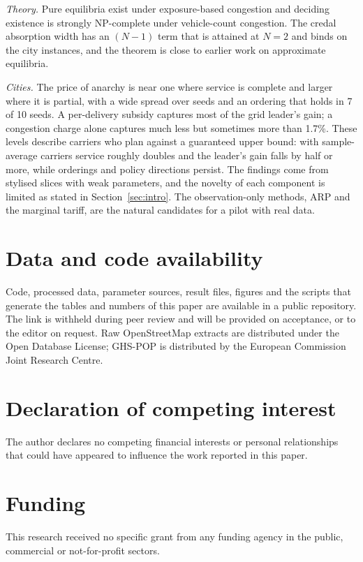 \documentclass[preprint,11pt]{elsarticle}
\theoremstyle{definition}
\theoremstyle{remark}
\begin{document}
\emph{Theory.} Pure equilibria exist under exposure-based congestion and deciding existence is strongly NP-complete under vehicle-count congestion. The credal absorption width has an $(N-1)$ term that is attained at $N=2$ and binds on the city instances, and the theorem is close to earlier work on approximate equilibria.

\emph{Cities.} The price of anarchy is near one where service is complete and larger where it is partial, with a wide spread over seeds and an ordering that holds in 7 of 10 seeds. A per-delivery subsidy captures most of the grid leader's gain; a congestion charge alone captures much less but sometimes more than 1.7\%. These levels describe carriers who plan against a guaranteed upper bound: with sample-average carriers service roughly doubles and the leader's gain falls by half or more, while orderings and policy directions persist. The findings come from stylised slices with weak parameters, and the novelty of each component is limited as stated in Section~\ref{sec:intro}. The observation-only methods, ARP and the marginal tariff, are the natural candidates for a pilot with real data.

\section*{Data and code availability}
Code, processed data, parameter sources, result files, figures and the scripts that generate the tables and numbers of this paper are available in a public repository. The link is withheld during peer review and will be provided on acceptance, or to the editor on request. Raw OpenStreetMap extracts are distributed under the Open Database License; GHS-POP is distributed by the European Commission Joint Research Centre.

\section*{Declaration of competing interest}
The author declares no competing financial interests or personal relationships that could have appeared to influence the work reported in this paper.

\section*{Funding}
This research received no specific grant from any funding agency in the public, commercial or not-for-profit sectors.
\end{document}

